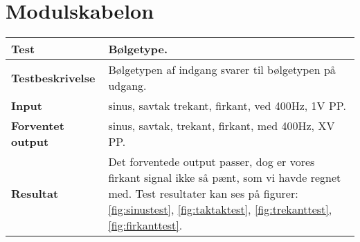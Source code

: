
\chapter{Modulskabelon}
\begin{center}
	\begin{tabular}{ | m{} | m{}|} 
		\hline
		\textbf{Test}					&Bølgetype. \\ \hline
		\textbf{Testbeskrivelse}		&Bølgetypen af indgang svarer til bølgetypen på udgang. \\ \hline
		\textbf{Input}					&sinus, savtak trekant, firkant, ved 400Hz, 1V PP. \\ \hline
		\textbf{Forventet output}		&sinus, savtak, trekant, firkant, med 400Hz, XV PP. \\ \hline
		\textbf{Resultat}				&Det forventede output passer, dog er vores firkant signal ikke så pænt, som vi havde regnet med. Test resultater kan ses på figurer: \ref{fig:sinustest}, \ref{fig:taktaktest}, \ref{fig:trekanttest}, \ref{fig:firkanttest}.  \\ \hline
	\end{tabular}
\end{center}